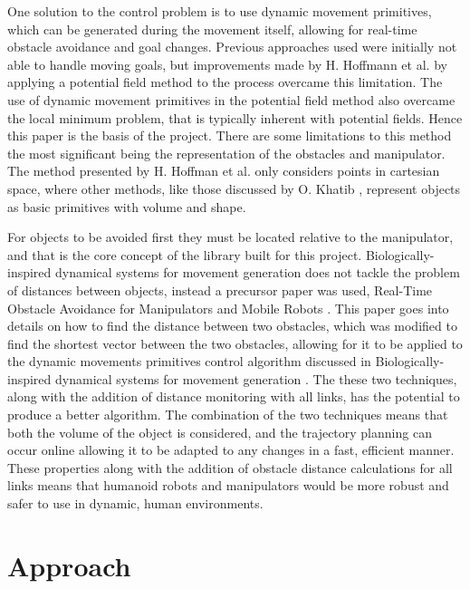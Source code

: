 \documentclass[a4paper, 10pt, conference]{ieeeconf}      %
\begin{document}
One solution to the control problem is to use dynamic movement primitives, which can be generated during the movement itself, allowing for real-time obstacle avoidance and goal changes. Previous approaches \cite{Janabi-Sharif} used were initially not able to handle moving goals, but improvements made by H. Hoffmann et al. \cite{Hoffmann} by applying a potential field method to the process overcame this limitation. The use of dynamic movement primitives in the potential field method also overcame the local minimum problem, that is typically inherent with potential fields. Hence this paper is the basis of the project. There are some limitations to this method the most significant being the representation of the obstacles and manipulator. The method presented by H. Hoffman et al.\cite{Hoffmann} only considers points in cartesian space, where other methods, like those discussed by O. Khatib \cite{Khatib}, represent objects as basic primitives with volume and shape. \\


For objects to be avoided first they must be located relative to the manipulator, and that is the core concept of the library built for this project. Biologically-inspired dynamical systems for movement generation \cite{Hoffmann} does not tackle the problem of distances between objects, instead a precursor paper was used, Real-Time Obstacle Avoidance for Manipulators and Mobile Robots \cite{Khatib}. This paper goes into details on how to find the distance between two obstacles, which was modified to find the shortest vector between the two obstacles, allowing for it to be applied to the dynamic movements primitives control algorithm discussed in Biologically-inspired dynamical systems for movement generation \cite{Hoffmann}. The these two techniques, along with the addition of distance monitoring with all links, has the potential to produce a better algorithm. The combination of the two techniques means that both the volume of the object is considered, and the trajectory planning can occur online allowing it to be adapted to any changes in a fast, efficient manner. These properties along with the addition of obstacle distance calculations for all links means that humanoid robots and manipulators would be more robust and safer to use in dynamic, human environments.

\section{Approach}
\end{document}
